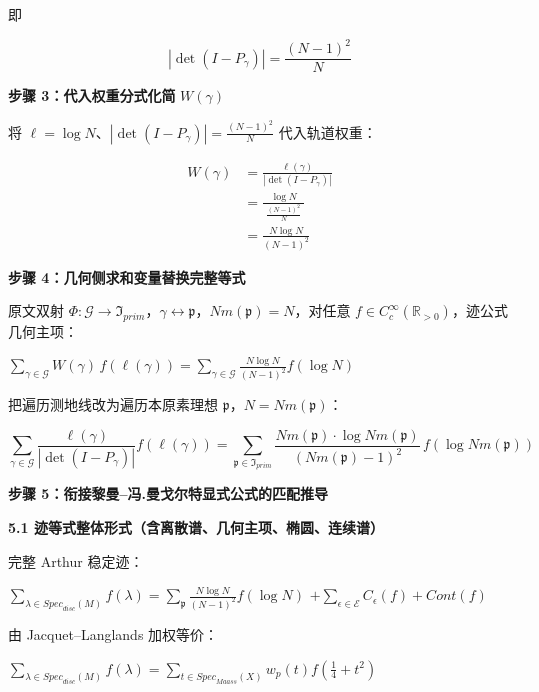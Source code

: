 \documentclass[11pt,a4paper]{ctexart}
\begin{document}
即

\[\left| \det\left( I - P_{\gamma} \right) \right| = \frac{(N - 1)^{2}}{N}\]

\textbf{步骤 3：代入权重分式化简} \(W(\gamma)\)

将
\(\ell{=}\log N\)、\(\left| \det\left( I - P_{\gamma} \right) \right| = \frac{(N - 1)^{2}}{N}\)
代入轨道权重：

\[\begin{aligned}
W(\gamma) & = \frac{\ell\left(\gamma\right)}{\left| \det\left( I - P_{\gamma} \right) \right|} \\
& = \frac{\log N}{\mspace{6mu}\frac{(N - 1)^{2}}{N}\mspace{6mu}} \\
& = \frac{N\log N}{(N - 1)^{2}}
\end{aligned}\]

\textbf{步骤 4：几何侧求和变量替换完整等式}

原文双射
\(\Phi:\mathcal{G} \rightarrow \mathfrak{I}_{prim}\)，\(\gamma \leftrightarrow \mathfrak{p}\)，\(Nm\left( \mathfrak{p} \right) = N\)，对任意
\(f \in C_{c}^{\infty}\left( \mathbb{R}_{> 0} \right)\)，迹公式几何主项：

\(\sum_{\gamma \in \mathcal{G}}^{}W(\gamma)\, f\left( \ell\left(\gamma\right) \right) = \sum_{\gamma \in \mathcal{G}}^{}\frac{N\log N}{(N - 1)^{2}}f\left( \log N \right)\)

把遍历测地线改为遍历本原素理想
\(\mathfrak{p}\)，\(N = Nm\left( \mathfrak{p} \right)\)：

\[\sum_{\gamma \in \mathcal{G}}^{}\frac{\ell\left(\gamma\right)}{\left| \det\left( I - P_{\gamma} \right) \right|}f\left( \ell\left(\gamma\right) \right) = \sum_{\mathfrak{p} \in \mathfrak{I}_{prim}}^{}\frac{Nm\left( \mathfrak{p} \right) \cdot \log{Nm}\left( \mathfrak{p} \right)}{\left( Nm\left( \mathfrak{p} \right) - 1 \right)^{2}}\, f\left( \log{Nm}\left( \mathfrak{p} \right) \right)\]

\textbf{步骤 5：衔接黎曼--冯.曼戈尔特显式公式的匹配推导}

\textbf{5.1 迹等式整体形式（含离散谱、几何主项、椭圆、连续谱）}

完整 Arthur 稳定迹：

\(\sum_{\lambda \in {Spec}_{disc}(M)}^{}f(\lambda) = \sum_{\mathfrak{p}}^{}\frac{N\log N}{(N - 1)^{2}}f\left( \log N \right)\)
\(+ \sum_{\epsilon \in \mathcal{E}}^{}C_{\epsilon}(f) + Cont(f)\)

由 Jacquet--Langlands 加权等价：

\(\sum_{\lambda \in {Spec}_{disc}(M)}^{}f(\lambda) = \sum_{t \in {Spec}_{Maass}(X)}^{}w_{p}(t)f\left( \frac{1}{4} + t^{2} \right)\)
\end{document}
